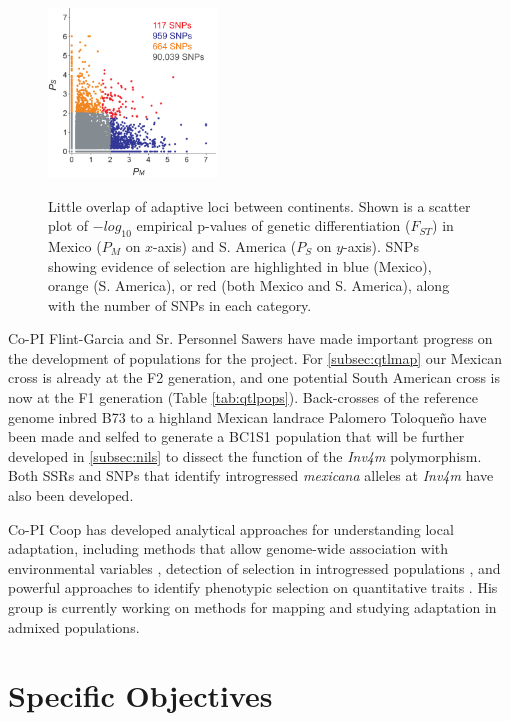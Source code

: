 \begin{figure}
  \centering \label{fig:fst}
   \includegraphics[width=0.4\textwidth]{fst.pdf}
  \caption{Little overlap of adaptive loci between continents. Shown is a scatter plot of $-log_{10}$ empirical p-values of genetic differentiation ($F_{ST}$) in Mexico ($P_M$ on $x$-axis) and S. America ($P_S$ on $y$-axis).  SNPs showing evidence of selection are highlighted in blue (Mexico), orange (S. America), or red (both Mexico and S. America), along with the number of SNPs in each category.} 
\end{figure}

Co-PI Flint-Garcia and Sr. Personnel Sawers have made important progress on the development of populations for the project. For \ref{subsec:qtlmap} our Mexican cross is already at the F2 generation, and one potential South American cross is now at the F1 generation  (Table \ref{tab:qtlpops}).  Back-crosses of the reference genome inbred B73 to a highland Mexican landrace Palomero Toloque\~no have been made and selfed to generate a BC1S1 population that will be further developed in \ref{subsec:nils} to dissect the function of the \emph{Inv4m} polymorphism. Both SSRs and SNPs that identify introgressed  \emph{mexicana} alleles at \emph{Inv4m} have also been developed.

Co-PI Coop has developed analytical approaches for understanding local adaptation, including methods that allow genome-wide association with environmental variables \citep{Coop2010, gunther2013robust}, detection of selection in introgressed populations \citep{Brandvain2013}, and powerful approaches to identify phenotypic selection on quantitative traits \cite{Berg2013}.  His group is currently working on methods for mapping and studying adaptation in admixed populations.

\section*{Specific Objectives}

